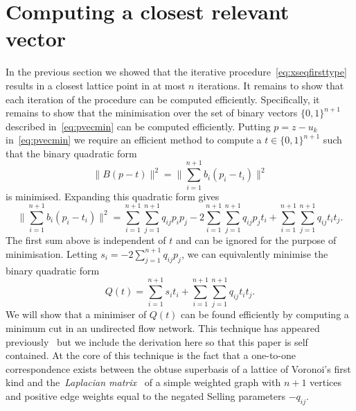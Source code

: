 \documentclass[final,leqno]{siamltex}
\begin{document}
\section{Computing a closest relevant vector}\label{sec:comp-clos-relev}

In the previous section we showed that the iterative procedure~\eqref{eq:xseqfirsttype} results in a closest lattice point in at most $n$ iterations.  It remains to show that each iteration of the procedure can be computed efficiently.  Specifically, it remains to show that the minimisation over the set of binary vectors $\{0,1\}^{n+1}$ described in~\eqref{eq:pvecmin} can be computed efficiently.  Putting $p = z - u_k$ in~\eqref{eq:pvecmin} we require an efficient method to compute a $t \in \{0,1\}^{n+1}$ such that the binary quadratic form
\[
\| B(p - t) \|^2 = \| \sum_{i=1}^{n+1} b_i (p_i - t_i) \|^2
\]
is minimised.  Expanding this quadratic form gives
\[
\| \sum_{i=1}^{n+1} b_i (p_i - t_i) \|^2 =  \sum_{i=1}^{n+1}\sum_{j=1}^{n+1} q_{ij}p_i p_j -  2\sum_{i=1}^{n+1}\sum_{j=1}^{n+1} q_{ij}p_j t_i + \sum_{i=1}^{n+1}\sum_{j=1}^{n+1} q_{ij} t_i t_j.
\]
The first sum above is independent of $t$ and can be ignored for the purpose of minimisation.  Letting $s_i = -2\sum_{j=1}^{n+1} q_{ij}p_j$, we can equivalently minimise the binary quadratic form
\begin{equation}\label{eq:quadformnp}
Q(t) = \sum_{i=1}^{n+1} s_i t_i + \sum_{i=1}^{n+1}\sum_{j=1}^{n+1} q_{ij} t_i t_j.
\end{equation}
We will show that a minimiser of $Q(t)$ can be found efficiently by computing a minimum cut in an undirected flow network.
This technique has appeared previously~\cite{Picard_min_cuts_1974,Sankaran_solving_CDMA_mincut_1998,Ulukus_cdma_mincut_1998,Cormen2001} but we include the derivation here so that this paper is self contained.  At the core of this technique is the fact that a one-to-one correspondence exists between the obtuse superbasis of a lattice of Voronoi's first kind and the~\emph{Laplacian matrix}~\cite{Chung_spectral_graph_theory_1997,Cvetković_spectra_graphs_1998} of a simple weighted graph with $n+1$ vertices and positive edge weights equal to the negated Selling parameters $-q_{ij}$.  
\end{document}
